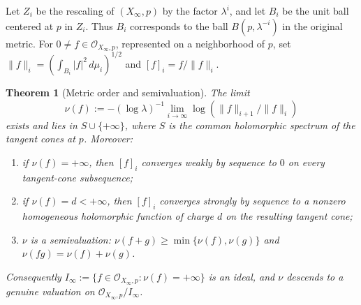 \documentclass[11pt]{amsart}
\newtheorem{theorem}{Theorem}[section]
\theoremstyle{definition}
\theoremstyle{remark}
\begin{document}
Let $Z_i$ be the rescaling of $(X_\infty,p)$ by the factor $\lambda^i$, and let
$B_i$ be the unit ball centered at $p$ in $Z_i$. Thus $B_i$ corresponds to the
ball $B(p,\lambda^{-i})$ in the original metric. For $0\neq f\in
\mathcal O_{X_\infty,p}$, represented on a neighborhood of $p$, set
$\|f\|_i=(\int_{B_i}|f|^2\,d\mu_i)^{1/2}$ and $[f]_i=f/\|f\|_i$.

\begin{theorem}[Metric order and semivaluation]
The limit
$$\nu(f):=-(\log\lambda)^{-1}\lim_{i\to\infty}\log(\|f\|_{i+1}/\|f\|_i)$$
exists and lies in $S\cup\{+\infty\}$, where $S$ is the common holomorphic
spectrum of the tangent cones at $p$. Moreover:
\begin{enumerate}
    \item if $\nu(f)=+\infty$, then $[f]_i$ converges weakly by sequence to $0$
    on every tangent-cone subsequence;
    \item if $\nu(f)=d<+\infty$, then $[f]_i$ converges strongly by sequence to
    a nonzero homogeneous holomorphic function of charge $d$ on the resulting
    tangent cone;
    \item $\nu$ is a semivaluation:
    $\nu(f+g)\geq \min\{\nu(f),\nu(g)\}$ and
    $\nu(fg)=\nu(f)+\nu(g)$.
\end{enumerate}
Consequently $I_\infty:=\{f\in\mathcal O_{X_\infty,p}:\nu(f)=+\infty\}$ is an
ideal, and $\nu$ descends to a genuine valuation on
$\mathcal O_{X_\infty,p}/I_\infty$.
\end{theorem}
\end{document}
